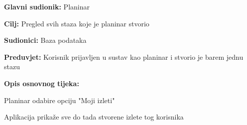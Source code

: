 			\noindent {}
		\begin{packed_item}
			
			\item \textbf{Glavni sudionik: }$ $Planinar$ $
			\item  \textbf{Cilj:} $ $Pregled svih staza koje je planinar stvorio$ $
			\item  \textbf{Sudionici:} $ $Baza podataka$ $
			\item  \textbf{Preduvjet:} $ $Korisnik prijavljen u sustav kao planinar i stvorio je barem jednu stazu$ $
			\item  \textbf{Opis osnovnog tijeka:}
			
			\item[] \begin{packed_enum}
				
				\item $ $Planinar odabire opciju "Moji izleti"$ $
				\item $ $Aplikacija prikaže sve do tada stvorene izlete tog korisnika$ $
			\end{packed_enum}
		\end{packed_item}
	

